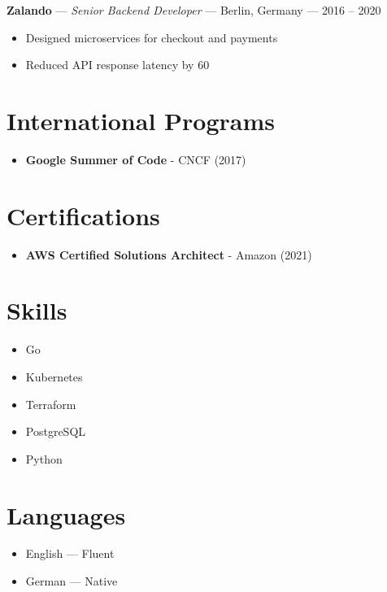 \documentclass[11pt,a4paper]{article}
\newcommand{\role}[4]{
    \noindent\textbf{#1} — \textit{#2} — #3 — #4\\
}
\begin{document}
\role{ Zalando }{ Senior Backend Developer }{ Berlin, Germany }{ 2016 -- 2020 }
\vspace{-0.8em}
\begin{itemize}[leftmargin=*, nosep]

    \item Designed microservices for checkout and payments

    \item Reduced API response latency by 60%

\end{itemize}
\vspace{0.3em}


\section*{International Programs}
\begin{itemize}[leftmargin=*, nosep]

    \item \textbf{ Google Summer of Code } - CNCF (2017)

\end{itemize}

\section*{Certifications}
\begin{itemize}[leftmargin=*, nosep]

    \item \textbf{ AWS Certified Solutions Architect } - Amazon (2021)

\end{itemize}

\section*{Skills}
\begin{itemize}[leftmargin=*, nosep]

    \item Go

    \item Kubernetes

    \item Terraform

    \item PostgreSQL

    \item Python

\end{itemize}

\section*{Languages}
\begin{itemize}[leftmargin=*, nosep]

    \item English — Fluent

    \item German — Native

\end{itemize}
\end{document}
